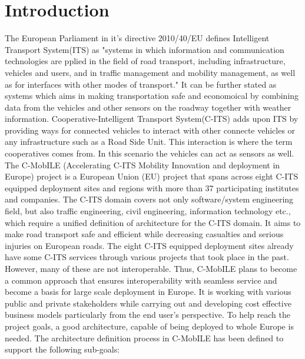 \documentclass[conference]{IEEEtran}
\begin{document}
\section{Introduction}
The European Parliament in it's directive 2010/40/EU \cite{ec} defines Intelligent Transport System(ITS) as "systems in which information and communication technologies are pplied in the field of road transport, including infrastructure, vehicles and users, and in traffic management and mobility management, as well as for interfaces with other modes of transport." It can be further stated as systems which aims in making transportation safe and economoical by combining data from the vehicles and other sensors on the roadway together with weather information. Cooperative-Intelligent Transport System(C-ITS) \cite{c-its} adds upon ITS by providing ways for connected vehicles to interact with other connecte vehicles or any infrastructure such as a Road Side Unit. This interaction is where the term cooperatives comes from. In this scenario the vehicles can act as sensors as well. 
The C-MobILE (Accelerating C-ITS Mobility Innovation and deployment in Europe) project is a European Union (EU) project that spans across eight C-ITS equipped deployment sites and regions with more than 37 participating institutes and companies. The C-ITS domain covers not only software/system engineering field, but also traffic engineering, civil engineering, information technology etc., which require a unified definition of architecture for the C-ITS domain. It aims to make road transport safe and efficient while decreasing casualties and serious injuries on European roads. The eight C-ITS equipped deployment sites already have some C-ITS services through various projects that took place in the past. However, many of these are not interoperable. Thus, C-MobILE plans to become a common approach that ensures interoperability with seamless service and become a basis for large scale deployment in Europe. It is working with various public and private stakeholders while carrying out and developing cost effective business models particularly from the end user’s perspective. To help reach the project goals, a good architecture, capable of being deployed to whole Europe is needed. The architecture definition process in C-MobILE has been defined to support the following sub-goals:
\end{document}
